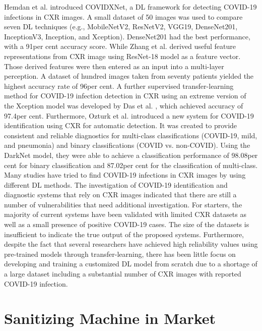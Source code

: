 \documentclass[a4paper,12pt]{report}
\begin{document}
Hemdan et al. \cite{ref18} introduced COVIDXNet, a DL framework for detecting
COVID-19 infections in CXR images. A small dataset of 50 images was used to compare
seven DL techniques (e.g., MobileNetV2, ResNetV2, VGG19, DenseNet201, InceptionV3,
Inception, and Xception). DenseNet201 had the best performance, with a 91per cent accuracy
score. While Zhang et al. \cite{ref19} derived useful feature representations from CXR image
using ResNet-18 model as a feature vector. Those derived features were then entered as
an input into a multi-layer perception. A dataset of hundred images taken from seventy
patients yielded the highest accuracy rate of 96per cent. A further supervised transfer-learning
method for COVID-19 infection detection in CXR using an extreme version of the Xception
model was developed by Das et al. \cite{ref12}, which achieved accuracy of 97.4per cent. Furthermore,
Ozturk et al. \cite{ref20} introduced a new system for COVID-19 identification using CXR for
automatic detection. It was created to provide consistent and reliable diagnostics for
multi-class classifications (COVID-19, mild, and pneumonia) and binary classifications
(COVID vs. non-COVID). Using the DarkNet model, they were able to achieve a classification performance of 98.08per cent for binary classification and 87.02per cent for the classification
of multi-class.
Many studies have tried to find COVID-19 infections in CXR images by using different
DL methods. The investigation of COVID-19 identification
and diagnostic systems that rely on CXR images indicated that there are still a number
of vulnerabilities that need additional investigation. For starters, the majority of current
systems have been validated with limited CXR datasets as well as a small presence of
positive COVID-19 cases. The size of the datasets is insufficient to indicate the true output
of the proposed systems. Furthermore, despite the fact that several researchers have
achieved high reliability values using pre-trained models through transfer-learning, there
has been little focus on developing and training a customized DL model from scratch due
to a shortage of a large dataset including a substantial number of CXR images with reported
COVID-19 infection.




\section{ Sanitizing Machine in Market}
\end{document}
